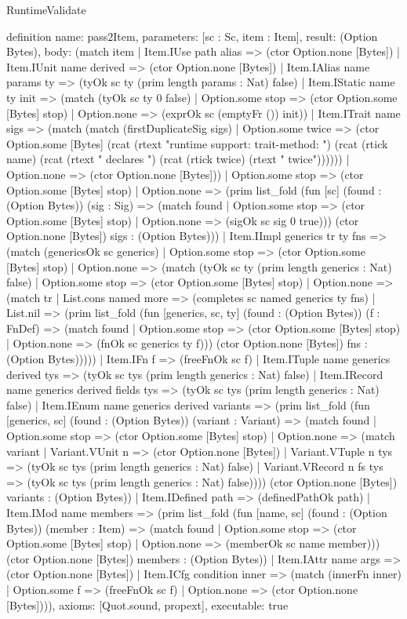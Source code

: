 \begin{lexlean}{RuntimeValidate}
\begin{semanticmodule}
definition{
  name: pass2Item,
  parameters: [sc : Sc, item : Item],
  result: (Option Bytes),
  body: (match item
    | Item.IUse path alias => (ctor Option.none [Bytes])
    | Item.IUnit name derived => (ctor Option.none [Bytes])
    | Item.IAlias name params ty => (tyOk sc ty (prim length params : Nat) false)
    | Item.IStatic name ty init => (match (tyOk sc ty 0 false)
      | Option.some stop => (ctor Option.some [Bytes] stop)
      | Option.none => (exprOk sc (emptyFr ()) init))
    | Item.ITrait name sigs => (match (match (firstDuplicateSig sigs)
        | Option.some twice => (ctor Option.some [Bytes] (rcat (rtext "runtime support: trait-method: ") (rcat (rtick name) (rcat (rtext " declares ") (rcat (rtick twice) (rtext " twice"))))))
        | Option.none => (ctor Option.none [Bytes]))
      | Option.some stop => (ctor Option.some [Bytes] stop)
      | Option.none => (prim list_fold (fun [sc] (found : (Option Bytes)) (sig : Sig) => (match found
        | Option.some stop => (ctor Option.some [Bytes] stop)
        | Option.none => (sigOk sc sig 0 true))) (ctor Option.none [Bytes]) sigs : (Option Bytes)))
    | Item.IImpl generics tr ty fns => (match (genericsOk sc generics)
      | Option.some stop => (ctor Option.some [Bytes] stop)
      | Option.none => (match (tyOk sc ty (prim length generics : Nat) false)
        | Option.some stop => (ctor Option.some [Bytes] stop)
        | Option.none => (match tr
          | List.cons named more => (completes sc named generics ty fns)
          | List.nil => (prim list_fold (fun [generics, sc, ty] (found : (Option Bytes)) (f : FnDef) => (match found
            | Option.some stop => (ctor Option.some [Bytes] stop)
            | Option.none => (fnOk sc generics ty f))) (ctor Option.none [Bytes]) fns : (Option Bytes)))))
    | Item.IFn f => (freeFnOk sc f)
    | Item.ITuple name generics derived tys => (tyOk sc tys (prim length generics : Nat) false)
    | Item.IRecord name generics derived fields tys => (tyOk sc tys (prim length generics : Nat) false)
    | Item.IEnum name generics derived variants => (prim list_fold (fun [generics, sc] (found : (Option Bytes)) (variant : Variant) => (match found
      | Option.some stop => (ctor Option.some [Bytes] stop)
      | Option.none => (match variant
        | Variant.VUnit n => (ctor Option.none [Bytes])
        | Variant.VTuple n tys => (tyOk sc tys (prim length generics : Nat) false)
        | Variant.VRecord n fs tys => (tyOk sc tys (prim length generics : Nat) false)))) (ctor Option.none [Bytes]) variants : (Option Bytes))
    | Item.IDefined path => (definedPathOk path)
    | Item.IMod name members => (prim list_fold (fun [name, sc] (found : (Option Bytes)) (member : Item) => (match found
      | Option.some stop => (ctor Option.some [Bytes] stop)
      | Option.none => (memberOk sc name member))) (ctor Option.none [Bytes]) members : (Option Bytes))
    | Item.IAttr name args => (ctor Option.none [Bytes])
    | Item.ICfg condition inner => (match (innerFn inner)
      | Option.some f => (freeFnOk sc f)
      | Option.none => (ctor Option.none [Bytes]))),
  axioms: [Quot.sound, propext],
  executable: true
}


\end{semanticmodule}
\end{lexlean}
